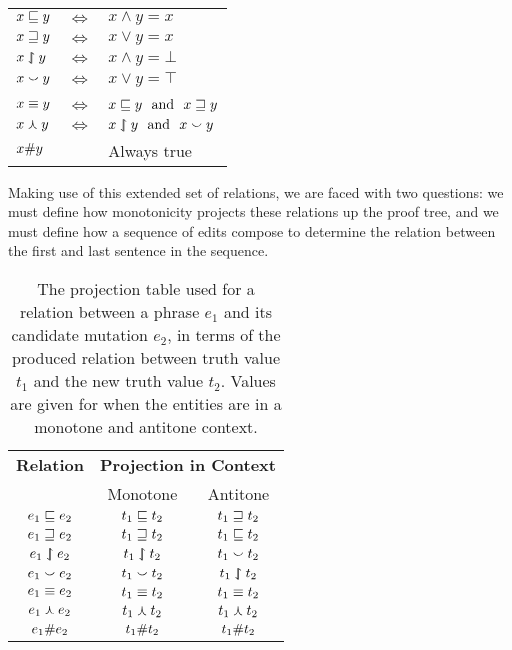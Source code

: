 \begin{center}
\begin{tabular}{lcl}
  $x \sqsubseteq y$ & $\Leftrightarrow$ & $x \land y = x$ \\
  $x \sqsupseteq y$ & $\Leftrightarrow$ & $x \lor y = x$ \\
  $x \downharpoonleft\hspace{-1.25mm}\upharpoonright y$ & $\Leftrightarrow$ & $x \land y = \bot$ \\
  $x \smallsmile y$ & $\Leftrightarrow$ & $x \lor y = \top$ \\
  \vspace{-0.5em} & & \\
  $x \equiv y$ & $\Leftrightarrow$ & $x \sqsubseteq y~~\textrm{and}~~x \sqsupseteq y$ \\
  $x \curlywedge y$ & $\Leftrightarrow$ & $x \downharpoonleft\hspace{-1.25mm}\upharpoonright y~~\textrm{and}~~x \smallsmile y$ \\
  $x \# y$ & & Always true
\end{tabular}
\end{center}

Making use of this extended set of relations, we are faced with two
  questions:
  we must define how monotonicity projects these relations up the
  proof tree,
  and we must define how a sequence of edits compose to determine the
  relation between the first and last sentence in the sequence.

\begin{table}
	\begin{center}
	\begin{tabular}{c|cc}
    \textbf{Relation} & \multicolumn{2}{|c}{\textbf{Projection in Context}} \\
             & Monotone & Antitone \\
    \hline
    $e_1 \sqsubseteq     e_2$ & $t_1 \sqsubseteq     t_2$ & $t_1 \sqsupseteq     t_2$ \\ 
    $e_1 \sqsupseteq     e_2$ & $t_1 \sqsupseteq     t_2$ & $t_1 \sqsubseteq     t_2$ \\ 
    $e_1 \downharpoonleft\hspace{-1.25mm}\upharpoonright   e_2$ & $t_1 \downharpoonleft\hspace{-1.25mm}\upharpoonright   t_2$ & $t_1 \smallsmile t_2$ \\ 
    $e_1 \smallsmile       e_2$ & $t_1 \smallsmile       t_2$ & $t_1 \downharpoonleft\hspace{-1.25mm}\upharpoonright       t_2$ \\ 
    $e_1 \equiv  e_2$ & $t_1 \equiv  t_2$ & $t_1 \equiv  t_2$ \\ 
    $e_1 \curlywedge      e_2$ & $t_1 \curlywedge      t_2$ & $t_1 \curlywedge   t_2$ \\ 
    $e_1 \# e_2$ & $t_1 \# t_2$ & $t_1 \# t_2$
	\end{tabular}
	\caption{
    The projection table used for a relation between a phrase $e_1$ and
      its candidate mutation $e_2$, in terms of the produced relation
      between truth value $t_1$ and the new truth value $t_2$.
    Values are given for when the entities are in a monotone and
      antitone context.
		\label{tab:projectivity}
	}
	\end{center}
\end{table}

